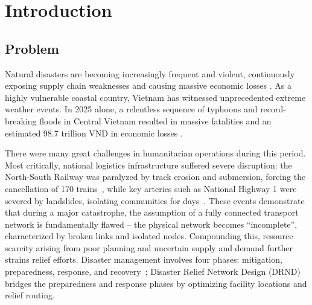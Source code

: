 \documentclass{llncs}
\newcommand{\quo}[1]{``#1''}
\newcommand{\mycomment}[1]{}
\begin{document}
\section{Introduction}
\subsection{Problem}

Natural disasters are becoming increasingly frequent and violent, continuously exposing supply chain weaknesses and causing massive economic losses \cite{ASEAN2021, CDP2025}.
As a highly vulnerable coastal country, Vietnam has witnessed unprecedented extreme weather events.
In 2025 alone, a relentless sequence of typhoons and record-breaking floods in Central Vietnam resulted in massive fatalities and an estimated 98.7 trillion VND in economic losses \cite{VOV2025, HanoiTimes2025}.

\mycomment{
Natural disasters are becoming more frequent and violent. Extreme floods in 2025 caused over 1,100 fatalities across Southeast Asia \cite{CDP2025}. These disasters expose supply chain weaknesses and cause massive economic losses \cite{ASEAN2021}. As a coastal country, Vietnam is vulnerable to typhoons and heavy floods. Climate change has made the weather events become more extreme. The year 2025 witnesses a relentless sequence of 15 typhoons and 6 tropical depressions for Vietnam, resulting in a total economic loss estimated at nearly 98.7 trillion VND (approximately 4 billion USD) and leaving 468 people dead or missing by year-end \cite{VOV2025, HanoiTimes2025}. Multiple meteorological records were broken. Central Vietnam and Nghe An provinces faced a record flood peak of 12,800 m3/s at the Ban Ve reservoir. At the Bach Ma peak, daily rainfall reached 1,740 mm, marking the highest level ever recorded in Vietnam's meteorological history. Additionally, rainfall in Dak Lak and the South Central region reached 1,900 mm, causing river levels to surpass the historical flood marks previously set in 1986 and 1993 \cite{VOV2025}.
}

There were many great challenges in humanitarian operations during this period.
Most critically, national logistics infrastructure suffered severe disruption: the North-South Railway was paralyzed by track erosion and submersion, forcing the cancellation of 170 trains~\cite{HanoiTimes2025}, while key arteries such as National Highway 1 were severed by landslides, isolating communities for days~\cite{ReliefWeb2020}.
These events demonstrate that during a major catastrophe, the assumption of a fully connected transport network is fundamentally flawed -- the physical network becomes \quo{incomplete}, characterized by broken links and isolated nodes.
Compounding this, resource scarcity arising from poor planning and uncertain supply and demand further strains relief efforts.
Disaster management involves four phases: mitigation, preparedness, response, and recovery~\cite{altay2006or}; Disaster Relief Network Design (DRND) bridges the preparedness and response phases by optimizing facility locations and relief routing.
\end{document}
